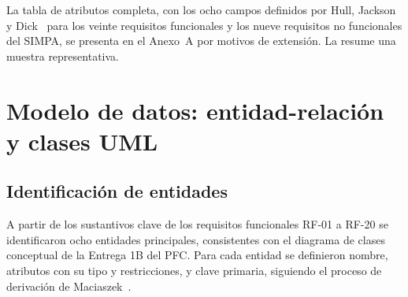 \documentclass[11pt,a4paper]{report}
\begin{document}
La tabla de atributos completa, con los ocho campos definidos por Hull, Jackson y Dick~\cite{hull2011}
para los veinte requisitos funcionales y los nueve requisitos no funcionales del SIMPA, se presenta en
el Anexo~A por motivos de extensión. La  resume una muestra representativa.

\begin{table}[H]
\centering
\caption{Muestra de la tabla de atributos (ver Anexo A para la tabla completa)}
\label{tab:atributos-muestra}
\end{table}
\chapter{Modelo de datos: entidad-relación y clases UML}
\label{sec:modelo-datos}

\section{Identificación de entidades}

A partir de los sustantivos clave de los requisitos funcionales RF-01 a RF-20 se identificaron ocho
entidades principales, consistentes con el diagrama de clases conceptual de la Entrega 1B del PFC.
Para cada entidad se definieron nombre, atributos con su tipo y restricciones, y clave primaria,
siguiendo el proceso de derivación de Maciaszek~\cite{maciaszek2007}.
\end{document}
